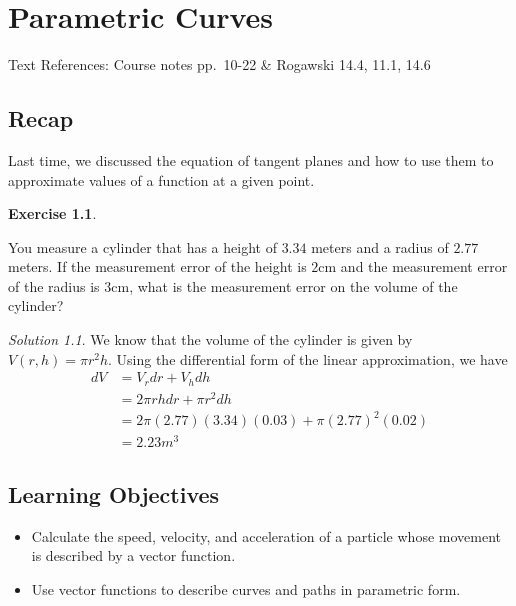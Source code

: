 \documentclass[
]{book}
\providecommand{\tightlist}{%
  \setlength{\itemsep}{0pt}\setlength{\parskip}{0pt}}
\theoremstyle{definition}
\theoremstyle{definition}
\theoremstyle{definition}
\newtheorem{exercise}{Exercise}[chapter]
\theoremstyle{definition}
\theoremstyle{remark}
\newtheorem*{solution}{Solution}
\begin{document}
\hypertarget{lec-5}{%
\chapter{Parametric Curves}\label{lec-5}}

Text References: Course notes pp.~10-22 \& Rogawski 14.4, 11.1, 14.6

\hypertarget{recap-3}{%
\section{Recap}\label{recap-3}}

Last time, we discussed the equation of tangent planes and how to use them to approximate values of a function at a given point.

\begin{exercise}
\protect\hypertarget{exr:unlabeled-div-30}{}\label{exr:unlabeled-div-30}

You measure a cylinder that has a height of \(3.34\) meters and a radius of \(2.77\) meters. If the measurement error of the height is \(2\)cm and the measurement error of the radius is \(3\)cm, what is the measurement error on the volume of the cylinder?

\end{exercise}

\begin{solution}

We know that the volume of the cylinder is given by \(V(r, h)=\pi r^2 h\). Using the differential form of the linear approximation, we have
\begin{align*}
dV &= V_r dr+ V_h dh \\
&= 2\pi r h dr + \pi r^2 dh\\
&= 2\pi(2.77)(3.34)(0.03)+\pi(2.77)^2(0.02)\\
&=2.23 m^3
\end{align*}

\end{solution}

\hypertarget{learning-objectives-4}{%
\section{Learning Objectives}\label{learning-objectives-4}}

\begin{itemize}
\tightlist
\item
  Calculate the speed, velocity, and acceleration of a particle whose movement is described by a vector function.
\item
  Use vector functions to describe curves and paths in parametric form.
\end{itemize}
\end{document}
